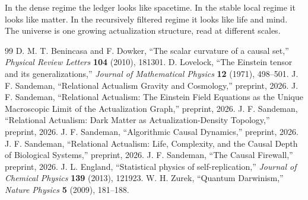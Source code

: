 \documentclass[11pt]{article}
\begin{document}
In the dense regime the ledger looks like spacetime. In the stable local regime it looks like matter. In the recursively filtered regime it looks like life and mind. The universe is one growing actualization structure, read at different scales.

\begin{thebibliography}{99}
 D. M. T. Benincasa and F. Dowker, ``The scalar curvature of a causal set,'' \emph{Physical Review Letters} \textbf{104} (2010), 181301.
 D. Lovelock, ``The Einstein tensor and its generalizations,'' \emph{Journal of Mathematical Physics} \textbf{12} (1971), 498--501.
 J. F. Sandeman, ``Relational Actualism Gravity and Cosmology,'' preprint, 2026.
 J. F. Sandeman, ``Relational Actualism: The Einstein Field Equations as the Unique Macroscopic Limit of the Actualization Graph,'' preprint, 2026.
 J. F. Sandeman, ``Relational Actualism: Dark Matter as Actualization-Density Topology,'' preprint, 2026.
 J. F. Sandeman, ``Algorithmic Causal Dynamics,'' preprint, 2026.
 J. F. Sandeman, ``Relational Actualism: Life, Complexity, and the Causal Depth of Biological Systems,'' preprint, 2026.
 J. F. Sandeman, ``The Causal Firewall,'' preprint, 2026.
 J. L. England, ``Statistical physics of self-replication,'' \emph{Journal of Chemical Physics} \textbf{139} (2013), 121923.
 W. H. Zurek, ``Quantum Darwinism,'' \emph{Nature Physics} \textbf{5} (2009), 181--188.
\end{thebibliography}
\end{document}
